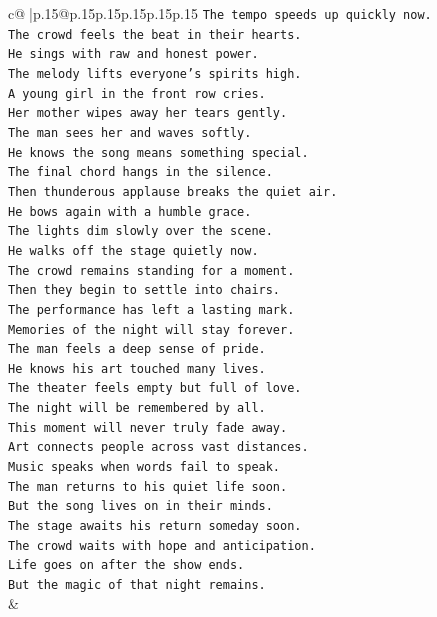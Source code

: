 \documentclass{article}
\begin{document}
{\begin{supertabular}{c@{$\;$}|p{.15\linewidth}@{}p{.15\linewidth}p{.15\linewidth}p{.15\linewidth}p{.15\linewidth}p{.15\linewidth}}
{{{\texttt{The tempo speeds up quickly now.} \\
\texttt{The crowd feels the beat in their hearts.} \\
\texttt{He sings with raw and honest power.} \\
\texttt{The melody lifts everyone's spirits high.} \\
\texttt{A young girl in the front row cries.} \\
\texttt{Her mother wipes away her tears gently.} \\
\texttt{The man sees her and waves softly.} \\
\texttt{He knows the song means something special.} \\
\texttt{The final chord hangs in the silence.} \\
\texttt{Then thunderous applause breaks the quiet air.} \\
\texttt{He bows again with a humble grace.} \\
\texttt{The lights dim slowly over the scene.} \\
\texttt{He walks off the stage quietly now.} \\
\texttt{The crowd remains standing for a moment.} \\
\texttt{Then they begin to settle into chairs.} \\
\texttt{The performance has left a lasting mark.} \\
\texttt{Memories of the night will stay forever.} \\
\texttt{The man feels a deep sense of pride.} \\
\texttt{He knows his art touched many lives.} \\
\texttt{The theater feels empty but full of love.} \\
\texttt{The night will be remembered by all.} \\
\texttt{This moment will never truly fade away.} \\
\texttt{Art connects people across vast distances.} \\
\texttt{Music speaks when words fail to speak.} \\
\texttt{The man returns to his quiet life soon.} \\
\texttt{But the song lives on in their minds.} \\
\texttt{The stage awaits his return someday soon.} \\
\texttt{The crowd waits with hope and anticipation.} \\
\texttt{Life goes on after the show ends.} \\
\texttt{But the magic of that night remains.} \\
            }
        }
    }
    & \\ \\


\end{supertabular}}
\end{document}

